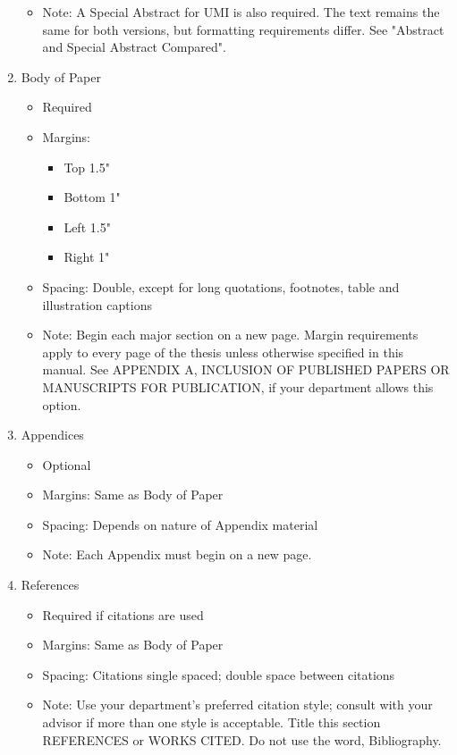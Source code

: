 \documentclass[draft]{ua-thesis}
\begin{document}
\begin{enumerate}
\begin{itemize}
        \item Note: A Special Abstract for UMI is also required. The text
          remains the same for both versions, but formatting requirements
          differ. See "Abstract and Special Abstract Compared".
        \end{itemize}
  \item Body of Paper
        \begin{itemize}
        \item Required
        \item Margins:
             \begin{itemize}
             \item Top 1.5"
             \item Bottom 1"
             \item Left 1.5"
             \item Right 1"
             \end{itemize}
        \item Spacing: Double, except for long quotations, footnotes, table and
          illustration captions
        \item Note: Begin each major section on a new page. Margin requirements
          apply to every page of the thesis unless otherwise specified in
          this manual. See APPENDIX A, INCLUSION OF PUBLISHED PAPERS OR
          MANUSCRIPTS FOR PUBLICATION, if your department allows this
          option.
        \end{itemize}
 \item Appendices
        \begin{itemize}
        \item Optional
        \item Margins: Same as Body of Paper
        \item Spacing: Depends on nature of Appendix material
        \item Note: Each Appendix must begin on a new page.
        \end{itemize}
 \item References
        \begin{itemize}
        \item Required if citations are used
        \item Margins: Same as Body of Paper
        \item Spacing: Citations single spaced; double space between citations
        \item Note: Use your department's preferred citation style; consult with
          your advisor if more than one style is acceptable. Title this
          section REFERENCES or WORKS CITED. Do not use the word,
          Bibliography.
        \end{itemize}
\end{enumerate}
\end{document}
